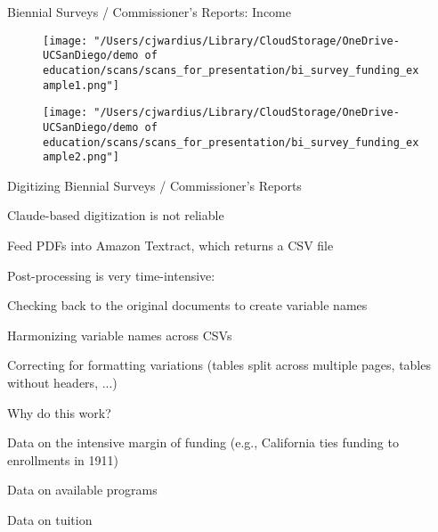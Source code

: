\documentclass[notes,11pt, aspectratio=169]{beamer}
\newenvironment{wideitemize}{\itemize\addtolength{\itemsep}{10pt}}{\enditemize}
\begin{document}
\begin{frame}{Biennial Surveys / Commissioner's Reports: Income}
  \begin{figure}
   \centering
   \begin{minipage}{0.48\textwidth}
        \centering
        \texttt{[image: "/Users/cjwardius/Library/CloudStorage/OneDrive-UCSanDiego/demo of education/scans/scans\_for\_presentation/bi\_survey\_funding\_example1.png"]}
   \end{minipage}
   \hfill
   \begin{minipage}{0.48\textwidth}
        \centering
        \texttt{[image: "/Users/cjwardius/Library/CloudStorage/OneDrive-UCSanDiego/demo of education/scans/scans\_for\_presentation/bi\_survey\_funding\_example2.png"]}
   \end{minipage}
\end{figure}
\end{frame}

\begin{frame}{Digitizing Biennial Surveys / Commissioner's Reports}
\begin{wideitemize}
  \item Claude-based digitization is not reliable
  \item Feed PDFs into Amazon Textract, which returns a CSV file
  \item Post-processing is very time-intensive:
  \begin{wideitemize}
    \item Checking back to the original documents to create variable names
    \item Harmonizing variable names across CSVs
    \item Correcting for formatting variations (tables split across multiple pages, tables without headers, ...)
  \end{wideitemize}
\end{wideitemize}
\end{frame}

\begin{frame}{Why do this work?}
  \begin{wideitemize}
    \item Data on the intensive margin of funding (e.g., California ties funding to enrollments in 1911)
    \item Data on available programs
    \item Data on tuition
  \end{wideitemize}
\end{frame}
\end{document}
